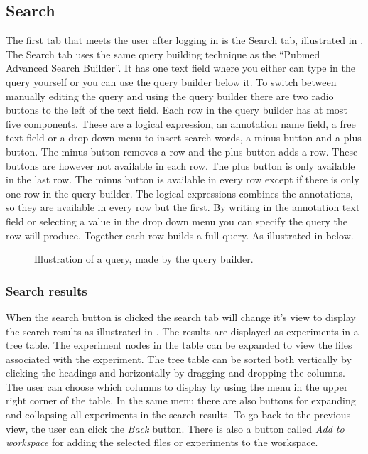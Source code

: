 \subsection{Search}
The first tab that meets the user after logging in is the Search tab, illustrated in . The Search tab uses the same query building technique as the “Pubmed Advanced Search Builder”\cite{des_3}. It has one text field where you either can type in the query yourself or you can use the query builder below it. To switch between manually editing the query and using the query builder there are two radio buttons to the left of the text field. Each row in the query builder has at most five components. These are a logical expression, an annotation name field, a free text field or a drop down menu to insert search words, a minus button and a plus button. The minus button removes a row and the plus button adds a row. These buttons are however not available in each row. The plus button is only available in the last row. The minus button is available in every row except if there is only one row in the query builder. The logical expressions combines the annotations, so they are available in every row but the first.
By writing in the annotation text field or selecting a value in the drop down menu you can specify the query the row will produce. Together each row builds a full query. As illustrated in  below.
\begin{figure}[htb]
	\caption{Illustration of a query, made by the query builder.}
	\label{fig:des_search-query}
\end{figure}
\FloatBarrier
\subsubsection{Search results}
When the search button is clicked the search tab will change it's view to display the search results as illustrated in . The results are displayed as experiments in a tree table. The experiment nodes in the table can be expanded to view the files associated with the experiment. The tree table can be sorted both vertically by clicking the headings and horizontally by dragging and dropping the columns. The user can choose which columns to display by using the menu in the upper right corner of the table. In the same menu there are also buttons for expanding and collapsing all experiments in the search results. To go back to the previous view, the user can click the \emph{Back} button. There is also a button called \emph{Add to workspace} for adding the selected files or experiments to the workspace.

